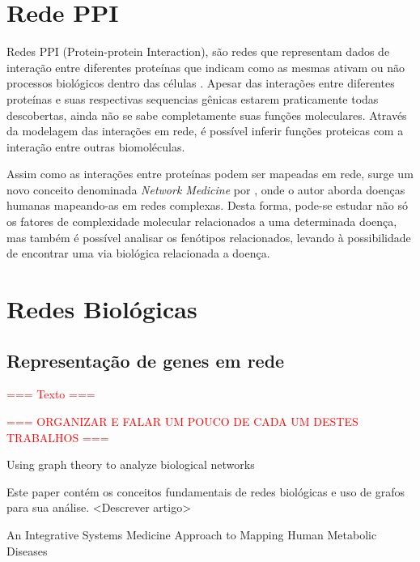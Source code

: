 


\section{Rede PPI}

Redes PPI (Protein-protein Interaction), são redes que representam dados de interação entre diferentes proteínas que indicam como as mesmas ativam ou não processos biológicos dentro das células \cite{Pavlopoulos2011}. Apesar das interações entre diferentes proteínas e suas respectivas sequencias gênicas estarem praticamente todas descobertas, ainda não se sabe completamente suas funções moleculares. Através da modelagem das interações em rede, é possível inferir funções proteicas com a interação entre outras biomoléculas.
%

Assim como as interações entre proteínas podem ser mapeadas em rede, surge um novo conceito denominada \textsl{Network Medicine} por \cite{Barabasi2011}, onde o autor aborda doenças humanas mapeando-as em redes complexas. Desta forma, pode-se estudar não só os fatores de complexidade molecular relacionados a uma determinada doença, mas também é possível analisar os fenótipos relacionados, levando à possibilidade de encontrar uma via biológica relacionada a doença.

\section{Redes Biológicas}

\subsection{Representação de genes em rede}
\textcolor{red}{=== Texto ===}

\textcolor{red}{=== ORGANIZAR E FALAR UM POUCO DE CADA UM DESTES TRABALHOS ===}

	Using graph theory to analyze biological networks
	\cite{Pavlopoulos2011}
	
	
	Este paper contém os conceitos fundamentais de redes biológicas e uso de grafos para sua análise.
<Descrever artigo>


	An Integrative Systems Medicine Approach to Mapping Human Metabolic Diseases
	\cite{Barabasi2011}
	
